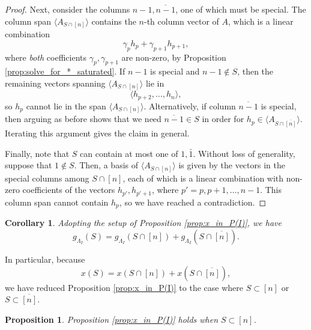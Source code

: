 \documentclass[12pt]{amsart}
\newtheorem{proposition}[definition]{Proposition}
\newtheorem{corollary}[definition]{Corollary}
\begin{document}
\begin{proof}
Next, consider the columns $n-1,\overline{n-1}$, one of which must be special. The column span $\langle A_{S \cap [n]}\rangle$ contains the $n$-th column vector of $A$, which is a linear combination
\begin{equation*}
    \gamma_ph_p+\gamma_{p+1}h_{p+1},
\end{equation*}
where \emph{both} coefficients $\gamma_p,\gamma_{p+1}$ are non-zero, by Proposition \ref{prop:solve_for_*_saturated}. If $n-1$ is special and $n-1\notin S$, then the remaining vectors spanning $\langle A_{S \cap [n]}\rangle$ lie in 
\begin{equation*}
    \langle h_{p+2},\ldots,h_n\rangle,
\end{equation*}
so $h_{p}$ cannot lie in the span $\langle A_{S \cap [n]} \rangle$. Alternatively, if column $\overline{n-1}$ is special, then arguing as before shows that we need $\overline{n-1} \in S$ in order for $h_p\in \langle A_{S \cap \overline{[n]}} \rangle$. Iterating this argument gives the claim in general.

Finally, note that $S$ can contain at most one of $1,\bar1$. Without loss of generality, suppose that $1\notin S$. Then, a basis of $\langle A_{S \cap [n]} \rangle$ is given by the vectors in the special columns among $S\cap [n]$, each of which is a linear combination with non-zero coefficients of the vectors $h_{p'},h_{p'+1}$, where $p'=p,p+1,\ldots,n-1$. This column span cannot contain $h_p$, so we have reached a contradiction.
\end{proof}

\begin{corollary}\label{cor:split_g}
Adopting the setup of Proposition \ref{prop:x_in_P(I)}, we have
\begin{equation*}
    g_{\Lambda_I}(S) = g_{\Lambda_I}(S \cap [n])+ g_{\Lambda_I}(S \cap \overline{[n]}).
\end{equation*}
\end{corollary}

In particular, because 
\begin{equation*}
x(S) = x(S \cap [n]) + x(S \cap \overline{[n]}),
\end{equation*}
we have reduced Proposition \ref{prop:x_in_P(I)} to the case where $S\subset[n]$ or $S\subset\overline{[n]}$. 

\begin{proposition}\label{prop:S_ineq_positive}
    Proposition \ref{prop:x_in_P(I)} holds when $S\subset[n]$.
\end{proposition}
\end{document}
